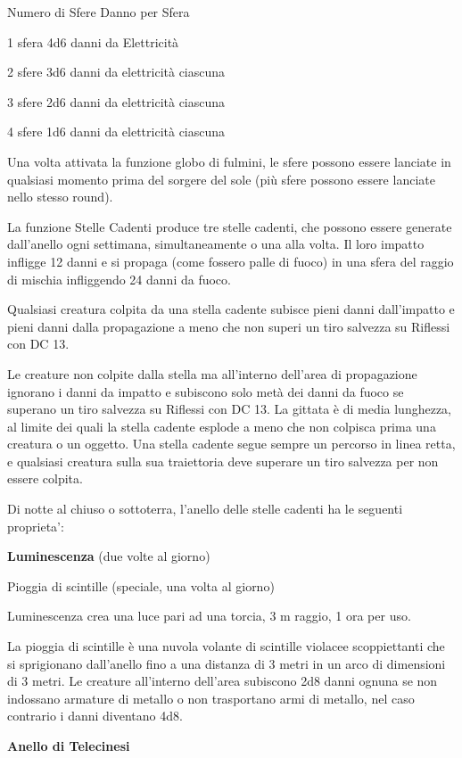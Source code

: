 \documentclass[a4paper,11pt,twoside,openany]{book}
\begin{document}
{Numero di Sfere Danno per Sfera

1 sfera 4d6 danni da Elettricità

2 sfere 3d6 danni da elettricità ciascuna

3 sfere 2d6 danni da elettricità ciascuna

4 sfere 1d6 danni da elettricità ciascuna

Una volta attivata la funzione globo di fulmini, le sfere possono essere lanciate in qualsiasi momento prima del sorgere del sole (più sfere possono essere lanciate nello stesso round).

La funzione Stelle Cadenti produce tre stelle cadenti, che possono essere generate dall'anello ogni settimana, simultaneamente o una alla volta. Il loro impatto infligge 12 danni e si propaga (come fossero palle di fuoco) in una sfera del raggio di mischia infliggendo 24 danni da fuoco.

Qualsiasi creatura colpita da una stella cadente subisce pieni danni dall'impatto e pieni danni dalla propagazione a meno che non superi un tiro salvezza su Riflessi con DC 13.

Le creature non colpite dalla stella ma all'interno dell'area di propagazione ignorano i danni da impatto e subiscono solo metà dei danni da fuoco se superano un tiro salvezza su Riflessi con DC 13. La gittata è di media lunghezza, al limite dei quali la stella cadente esplode a meno che non colpisca prima una creatura o un oggetto. Una stella cadente segue sempre un percorso in linea retta, e qualsiasi creatura sulla sua traiettoria deve superare un tiro salvezza per non essere colpita. 

Di notte al chiuso o sottoterra, l'anello delle stelle cadenti ha le seguenti proprieta':

\textbf{Luminescenza} (due volte al giorno)

Pioggia di scintille (speciale, una volta al giorno)

Luminescenza crea una luce pari ad una torcia, 3 m raggio, 1 ora per
uso.

La pioggia di scintille è una nuvola volante di scintille violacee scoppiettanti che si sprigionano dall'anello fino a una distanza di 3 metri in un arco di dimensioni di 3 metri. Le creature all'interno dell'area subiscono 2d8 danni ognuna se non indossano armature di metallo o non trasportano armi di metallo, nel caso contrario i danni diventano 4d8.

\textbf{Anello di Telecinesi}

}
\end{document}
